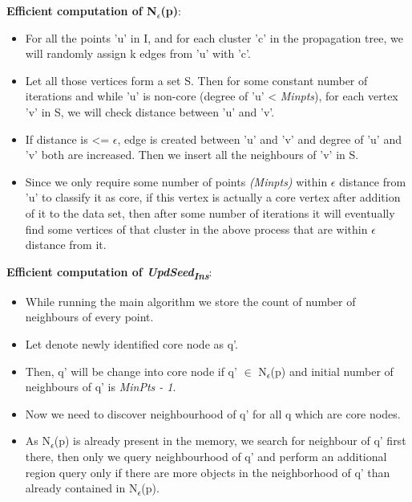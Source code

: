\documentclass[acmsmall]{acmart}
\begin{document}
\begin{enumerate}
\begin{itemize}
        \textbf{Efficient computation of N\textsubscript{$\epsilon$}(p)}:
        \begin{itemize}
            \item For all the points 'u' in I, and for each cluster 'c' in the propagation tree, we will randomly assign k edges from 'u' with 'c'. 
            \item Let all those vertices form a set S. Then for some constant number of iterations and while 'u' is non-core (degree of 'u' < \textit{Minpts}), for each vertex 'v' in S, we will check distance between 'u' and 'v'. 
            \item If distance is <= $\epsilon$, edge is created between 'u' and 'v' and degree of 'u' and 'v' both are increased. Then we insert all the neighbours of 'v' in S. 
    
            \item Since we only require some number of points \textit{(Minpts)} within $\epsilon$ distance from 'u' to classify it as core, if this vertex is actually a core vertex after addition of it to the data set, then after some number of iterations it will eventually find some vertices of that cluster in the above process that are within $\epsilon$ distance from it. \\
        \end{itemize} 
     
        \textbf{Efficient computation of \textit{UpdSeed\textsubscript{Ins}}}:
        \begin{itemize}
            \item While running the main algorithm we store the count of number of neighbours of every point.
            \item Let denote newly identified core node as q'.
            
            \item Then, q' will be change into core node if q' $\in$ N\textsubscript{$\epsilon$}(p) and initial number of neighbours of  q' is \textit{MinPts - 1}.
            
            \item Now we need to discover neighbourhood of q' for all q which are core nodes.
            
            \item As N\textsubscript{$\epsilon$}(p) is already present in the memory, we search for neighbour of q' first there, then only we query neighbourhood of q’ and perform an additional region query only if there are more objects in the neighborhood of q’ than already contained in N\textsubscript{$\epsilon$}(p). \\ 
        \end{itemize}
        

\end{itemize}
\end{enumerate}
\end{document}
